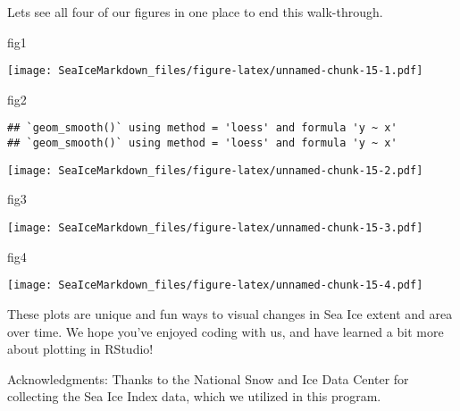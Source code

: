 \documentclass[]{article}
\newenvironment{Shaded}{\begin{snugshade}}{\end{snugshade}}
\newcommand{\NormalTok}[1]{#1}
\begin{document}
Lets see all four of our figures in one place to end this walk-through.

\begin{Shaded}
\begin{Highlighting}[]
\NormalTok{fig1}
\end{Highlighting}
\end{Shaded}

\texttt{[image: SeaIceMarkdown\_files/figure-latex/unnamed-chunk-15-1.pdf]}

\begin{Shaded}
\begin{Highlighting}[]
\NormalTok{fig2}
\end{Highlighting}
\end{Shaded}

\begin{verbatim}
## `geom_smooth()` using method = 'loess' and formula 'y ~ x'
## `geom_smooth()` using method = 'loess' and formula 'y ~ x'
\end{verbatim}

\texttt{[image: SeaIceMarkdown\_files/figure-latex/unnamed-chunk-15-2.pdf]}

\begin{Shaded}
\begin{Highlighting}[]
\NormalTok{fig3}
\end{Highlighting}
\end{Shaded}

\texttt{[image: SeaIceMarkdown\_files/figure-latex/unnamed-chunk-15-3.pdf]}

\begin{Shaded}
\begin{Highlighting}[]
\NormalTok{fig4}
\end{Highlighting}
\end{Shaded}

\texttt{[image: SeaIceMarkdown\_files/figure-latex/unnamed-chunk-15-4.pdf]}

These plots are unique and fun ways to visual changes in Sea Ice extent
and area over time. We hope you've enjoyed coding with us, and have
learned a bit more about plotting in RStudio!

Acknowledgments: Thanks to the National Snow and Ice Data Center for
collecting the Sea Ice Index data, which we utilized in this program.
\end{document}
